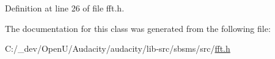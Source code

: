 Definition at line 26 of file fft.\+h.



The documentation for this class was generated from the following file\+:\begin{DoxyCompactItemize}
\item 
C\+:/\+\_\+dev/\+Open\+U/\+Audacity/audacity/lib-\/src/sbsms/src/\hyperlink{lib-src_2sbsms_2src_2fft_8h}{fft.\+h}\end{DoxyCompactItemize}
